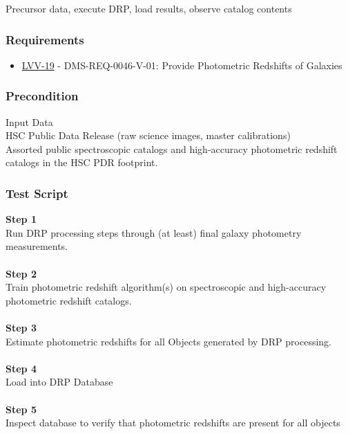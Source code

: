 Precursor data, execute DRP, load results, observe catalog contents

\hypertarget{requirements-45}{%
\subsubsection{Requirements}\label{requirements-45}}

\begin{itemize}
\tightlist
\item
  \href{https://jira.lsstcorp.org/browse/LVV-19}{LVV-19} -
  DMS-REQ-0046-V-01: Provide Photometric Redshifts of Galaxies
\end{itemize}

\hypertarget{precondition-5}{%
\subsubsection{Precondition}\label{precondition-5}}

Input Data\\
HSC Public Data Release (raw science images, master calibrations)\\
Assorted public spectroscopic catalogs and high-accuracy photometric
redshift catalogs in the HSC PDR footprint.

\hypertarget{test-script-45}{%
\subsubsection{Test Script}\label{test-script-45}}

\textbf{Step 1}\\
Run DRP processing steps through (at least) final galaxy photometry
measurements.\\
~\\
\textbf{Step 2}\\
Train photometric redshift algorithm(s) on spectroscopic and
high-accuracy photometric redshift catalogs.\\
~\\
\textbf{Step 3}\\
Estimate photometric redshifts for all Objects generated by DRP
processing.\\
~\\
\textbf{Step 4}\\
Load into DRP Database\\
~\\
\textbf{Step 5}\\
Inspect database to verify that photometric redshifts are present for
all objects\\
~\\

